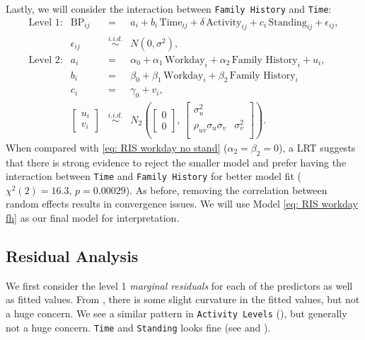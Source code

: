\documentclass[12pt,twoside,letterpaper]{article}
\theoremstyle{definition}
\theoremstyle{definition}
\begin{document}
Lastly, we will consider the interaction between \texttt{Family History} and \texttt{Time}:
\begin{equation}\label{eq: RIS workday fh}
    \begin{array}{rrcll}
        \text{Level 1}: & \text{BP}_{ij} &=& a_i + b_i\, \text{Time}_{ij} + \delta \, \text{Activity}_{ij} + c_i\, \text{Standing}_{ij} + \epsilon_{ij}, \\[0.5ex]
         & \epsilon_{ij} &\overset{i.i.d.}{\sim}& N(0, \sigma^2), \\[0.5ex]
        \text{Level 2}: & a_i &=& \alpha_0 + \alpha_1\, \text{Workday}_i + \alpha_2\, \text{Family History}_i + u_i, \\[0.5ex]
        & b_i &=& \beta_0 + \beta_1\, \text{Workday}_i+ \beta_2\, \text{Family History}_i \\[0.5ex]
        & c_i &=& \gamma_0 + v_i, \\[1ex]
         & \begin{bmatrix} u_i \\ v_i 
         \end{bmatrix} &\overset{i.i.d.}{\sim}& N_2\left(\begin{bmatrix} 0 \\ 0 \end{bmatrix},\, \begin{bmatrix} \sigma_u^2 &\\ 
         \rho_{uv}\sigma_u\sigma_v & \sigma_v^2\\
         \end{bmatrix} \right).
    \end{array}
\end{equation}
When compared with \ref{eq: RIS workday no stand} ($\alpha_2 = \beta_2 = 0$), a LRT suggests that there is strong evidence to reject the smaller model and prefer having the interaction between \texttt{Time} and \texttt{Family History} for better model fit ($\chi^2 (2) = 16.3$, $p = 0.00029$). As before, removing the correlation between random effects results in convergence issues. We will use Model \ref{eq: RIS workday fh} as our final model for interpretation.

\subsection{Residual Analysis}\label{sec: resid}

We first consider the level 1 \emph{marginal residuals} for each of the predictors as well as fitted values. From , there is some slight curvature in the fitted values, but not a huge concern. We see a similar pattern in \texttt{Activity Levels} (), but generally not a huge concern. \texttt{Time} and \texttt{Standing} looks fine (see  and ). 
\end{document}
